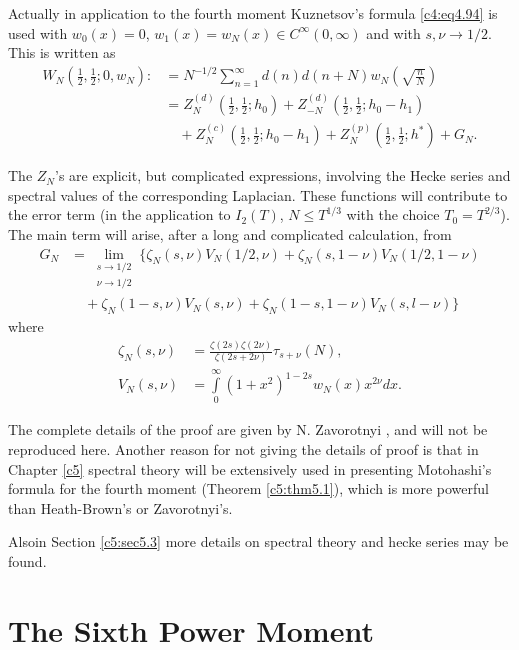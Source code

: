 Actually in application to the fourth moment Kuznetsov's formula
\eqref{c4:eq4.94} is used with $w_0 (x) =0$, $w_1 (x)= w_N(x) \in
C^\infty (0, \infty)$ and with $s, \nu \to 1/2$. This is written as 
\begin{align*}
   W_N \left(\frac{1}{2} , \frac{1}{2}; 0, w_N \right): & = N^{-1/2}
  \sum_{n=1}^\infty d(n) d(n+N)w_N \left(\sqrt{\frac{n}{N}} \right)\\
  & = Z_N^{(d)} \left(\frac{1}{2}, \frac{1}{2}; h_0 \right) +
  Z_{-N}^{(d)} \left(\frac{1}{2}, \frac{1}{2}; h_0- h_1 \right)\\
  & \quad  +Z_N^{(c)} \left(\frac{1}{2}, \frac{1}{2}; h_0- h_1 \right) +
  Z_N^{(p)} \left(\frac{1}{2}, \frac{1}{2}; h^* \right)+ G_N.
\end{align*}

The $Z_N$'s are explicit, but complicated expressions, involving the
Hecke series and spectral values of the corresponding Laplacian. These
functions will contribute to the error term (in the application to
$I_2 (T)$, $N\leq T^{1/3}$ with the choice $T_0 = T^{2/3}$). The main
term will arise, after a long and complicated calculation, from
\begin{align*}
  G_N &= \lim\limits_{\substack{s \to 1/2\\\nu\to 1/2}} \Big\{\zeta_N (s,
  \nu) V_N (1/2, \nu) +  \zeta_N (s, 1- \nu) V_N (1/2, 1-\nu)\\ 
  &\quad +
  \zeta_N (1- s, \nu) V_N (s, \nu)+ \zeta_N (1-s, 1-\nu) V_N (s,
  l-\nu) \Big\}
\end{align*}
where
\begin{align*}
  \zeta_N (s, \nu) & = \frac{\zeta(2 s)\zeta(2\nu)}{\zeta(2s+ 2\nu)}
  \tau_{s+\nu} (N),\\
  V_N (s, \nu) & = \int\limits_0^\infty (1+ x^2)^{1-2s}w_N (x) x^{2
    \nu} dx.
\end{align*}

The complete details of the proof are given by N. Zavorotnyi \cite{Zavorotnyi1},
and will not be reproduced here. Another reason for not giving the
details of proof is that in Chapter \ref{c5} spectral theory will be
extensively used in presenting Motohashi's formula for the fourth
moment (Theorem \ref{c5:thm5.1}), which is more powerful than
Heath-Brown's or Zavorotnyi's.

Also\pageoriginale in Section \ref{c5:sec5.3} more details on spectral
theory and hecke series may be found.

\section{The Sixth Power Moment}\label{c4:sec4.7}

